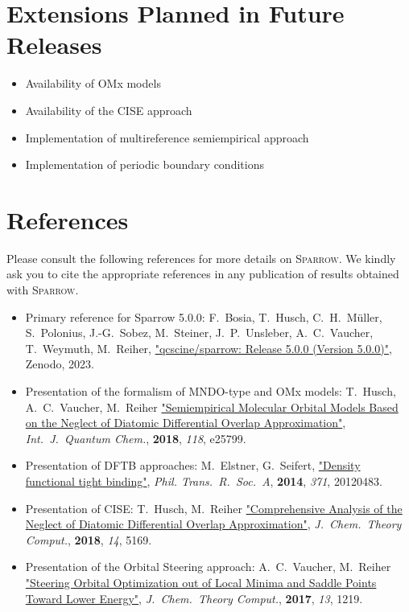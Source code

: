 \documentclass[]{tufte-book}
\begin{document}
\chapter{Extensions Planned in Future Releases}
\begin{itemize}
\item Availability of OMx models
\item Availability of the CISE approach
\item Implementation of multireference semiempirical approach
\item Implementation of periodic boundary conditions
\end{itemize}



\chapter{References}

Please consult the following references for more details on \textsc{Sparrow}.
We kindly ask you to cite the appropriate references in any publication of results obtained with \textsc{Sparrow}.
\vspace{1.0cm}

\begin{itemize}
\item Primary reference for Sparrow 5.0.0:
F.~Bosia, T.~Husch, C.~H.~M\"uller, S.~Polonius, J.-G.~Sobez, M.~Steiner, J.~P.~Unsleber, A.~C.~Vaucher, T.~Weymuth, M.~Reiher, \href{https://doi.org/10.5281/zenodo.3244105}{"qcscine/sparrow: Release 5.0.0 (Version 5.0.0)"}, Zenodo, 2023.
\item Presentation of the formalism of MNDO-type and OMx models: \newline
T.~Husch, A.~C.~Vaucher, M.~Reiher \href{https://doi.org/10.1002/qua.25799}{"Semiempirical Molecular Orbital Models Based on the Neglect of Diatomic Differential Overlap Approximation"}, \textit{Int.~J.~Quantum Chem.}, \textbf{2018}, \textit{118}, e25799.
\item Presentation of DFTB approaches: \newline
M.~Elstner, G.~Seifert, \href{https://doi.org/10.1098/rsta.2012.0483}{"Density functional tight binding"}, \textit{Phil. Trans.~R.~Soc.~A}, \textbf{2014}, \textit{371}, 20120483.
\item Presentation of CISE: \newline
T.~Husch, M.~Reiher \href{https://doi.org/10.1021/acs.jctc.8b00601}{"Comprehensive Analysis of the Neglect of Diatomic Differential Overlap Approximation"}, \textit{J.~Chem.~Theory Comput.}, \textbf{2018}, \textit{14}, 5169.
\item Presentation of the Orbital Steering approach: \newline
A.~C.~Vaucher, M.~Reiher
    \href{https://doi.org/10.1021/acs.jctc.7b00011}{"Steering Orbital
    Optimization out of Local Minima and Saddle Points Toward Lower Energy"},
    \textit{J.~Chem.~Theory Comput.}, \textbf{2017}, \textit{13}, 1219.
\end{itemize}
\end{document}
